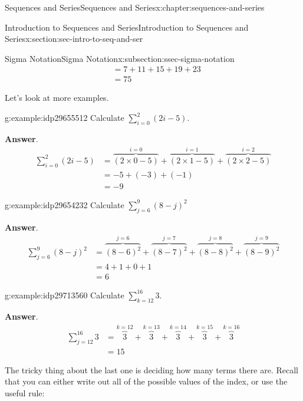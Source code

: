 \documentclass[twoside,10pt,]{book}
\newcommand{\blocktitlefont}{\relax}
\numberwithin{equation}{section}
\newcommand{\amp}{&}
\begin{document}
\begin{chapterptx}{Sequences and Series}{}{Sequences and Series}{}{}{x:chapter:sequences-and-series}
\begin{sectionptx}{Introduction to Sequences and Series}{}{Introduction to Sequences and Series}{}{}{x:section:sec-intro-to-seq-and-ser}
\begin{subsectionptx}{Sigma Notation}{}{Sigma Notation}{}{}{x:subsection:ssec-sigma-notation}
\begin{align*}
\amp = 7 + 11 + 15 + 19 + 23\\
\amp = 75
\end{align*}
%
\par
Let's look at more examples. \begin{example}{}{g:example:idp29655512}%
Calculate \(\sum\limits_{i = 0}^2 {(2i - 5)}\).\par\smallskip%
\noindent\textbf{\blocktitlefont Answer}.\label{g:answer:idp29655000}{}\hypertarget{g:answer:idp29655000}{}\quad{}%
\begin{align*}
\sum\limits_{i = 0}^2 {(2i - 5)} \amp = \overbrace {\left( {2 \times 0 - 5} \right)}^{i = 0} + \overbrace {\left( {2 \times 1 - 5} \right)}^{i = 1} + \overbrace {\left( {2 \times 2 - 5} \right)}^{i = 2}\\
\amp =  -5 + (- 3) +  (- 1)\\
\amp = -9
\end{align*}
\end{example}
 \begin{example}{}{g:example:idp29654232}%
Calculate \(\sum\limits_{j = 6}^9 {{{\left( {8 - j} \right)}^2}}\)\par\smallskip%
\noindent\textbf{\blocktitlefont Answer}.\label{g:answer:idp29716376}{}\hypertarget{g:answer:idp29716376}{}\quad{}%
\begin{align*}
\sum\limits_{j = 6}^9 {{{\left( {8 - j} \right)}^2}} \amp =\overbrace {\left( {8 - 6} \right)^2} ^{j = 6} + \overbrace {\left( {8 - 7} \right)^2} ^{j = 7} + \overbrace {\left( {8 - 8} \right)^2} ^{j = 8} + \overbrace {\left( {8 - 9} \right)^2}^{j = 9}\\
\amp = 4+1+0+1\\
\amp = 6
\end{align*}
\end{example}
 \begin{example}{}{g:example:idp29713560}%
Calculate \(\sum\limits_{k = 12}^{16} 3\).\par\smallskip%
\noindent\textbf{\blocktitlefont Answer}.\label{g:answer:idp29711000}{}\hypertarget{g:answer:idp29711000}{}\quad{}%
\begin{align*}
\sum\limits_{j = 12}^{16} 3 \amp = \overbrace{3}^{k=12} + \overbrace{3}^{k=13} + \overbrace{3}^{k=14} + \overbrace{3}^{k=15} + \overbrace{3}^{k=16}\\
\amp = 15
\end{align*}
\end{example}
%
\par
The tricky thing about the last one is deciding how many terms there are.  Recall that you can either write out all of the possible values of the index, or use the useful rule:%

\end{subsectionptx}
\end{sectionptx}
\end{chapterptx}
\end{document}
